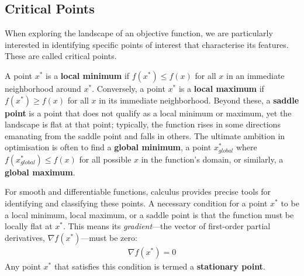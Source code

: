 \subsection{Critical Points}
\label{ssec:critical_points}

When exploring the landscape of an objective function, we are particularly interested in identifying specific points of interest that characterise its features. These are called critical points.

A point $x^*$ is a \textbf{local minimum} if $f(x^*) \leq f(x)$ for all $x$ in an immediate neighborhood around $x^*$. Conversely, a point $x^*$ is a \textbf{local maximum} if $f(x^*) \geq f(x)$ for all $x$ in its immediate neighborhood. Beyond these, a \textbf{saddle point} is a point that does not qualify as a local minimum or maximum, yet the landscape is flat at that point; typically, the function rises in some directions emanating from the saddle point and falls in others. The ultimate ambition in optimisation is often to find a \textbf{global minimum}, a point $x_{global}^*$ where $f(x_{global}^*) \leq f(x)$ for all possible $x$ in the function's domain, or similarly, a \textbf{global maximum}.

For smooth and differentiable functions, calculus provides precise tools for identifying and classifying these points. A necessary condition for a point $x^*$ to be a local minimum, local maximum, or a saddle point is that the function must be locally flat at $x^*$. This means its \textit{gradient}---the vector of first-order partial derivatives, $\nabla f(x^*)$---must be zero:
\begin{align}
    \nabla f(x^*) = 0
\end{align}
Any point $x^*$ that satisfies this condition is termed a \textbf{stationary point}.

